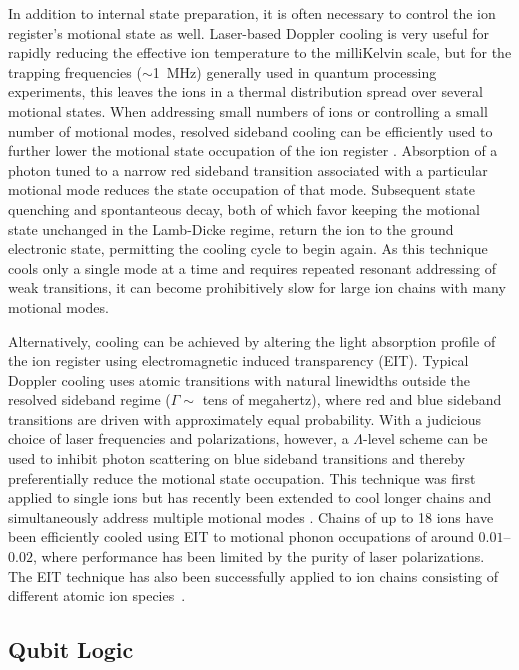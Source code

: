 \documentclass[%
reprint,
 amsmath,amssymb,
]{revtex4-1}
\begin{document}
In addition to internal state preparation, it is often necessary to control the ion register's motional state as well. Laser-based Doppler cooling is very useful for rapidly reducing the effective ion temperature to the milliKelvin scale, but for the trapping frequencies ($\sim$1~MHz) generally used in quantum processing experiments, this leaves the ions in a thermal distribution spread over several motional states.  When addressing small numbers of ions or controlling a small number of motional modes, resolved sideband cooling can be efficiently used to further lower the motional state occupation of the ion register \cite{DiedrichZeroPoint1989,MonroeCNOT1995}. Absorption of a photon tuned to a narrow red sideband transition associated with a particular motional mode reduces the state occupation of that mode. Subsequent state quenching and spontanteous decay, both of which favor keeping the motional state unchanged in the Lamb-Dicke regime, return the ion to the ground electronic state, permitting the cooling cycle to begin again.  As this technique cools only a single mode at a time and requires repeated resonant addressing of weak transitions, it can become prohibitively slow for large ion chains with many motional modes.

Alternatively, cooling can be achieved by altering the light absorption profile of the ion register using electromagnetic induced transparency (EIT). Typical Doppler cooling uses atomic transitions with natural linewidths outside the resolved sideband regime ($\Gamma\sim$ tens of megahertz), where red and blue sideband transitions are driven with approximately equal probability.  With a judicious choice of laser frequencies and polarizations, however, a $\Lambda$-level scheme can be used to inhibit photon scattering on blue sideband transitions and thereby preferentially reduce the motional state occupation. This technique was first applied to single ions \cite{PhysRevLett.85.4458,roos2000experimental} but has recently been extended to cool longer chains and simultaneously address multiple motional modes \cite{lechner2016electromagnetically}. Chains of up to 18 ions have been efficiently cooled using EIT to motional phonon occupations of around $0.01$--$0.02$, where performance has been limited by the purity of laser polarizations. The EIT technique has also been successfully applied to ion chains consisting of different atomic ion species~\cite{lin2013sympathetic}.



\subsection{Qubit Logic}
\end{document}

